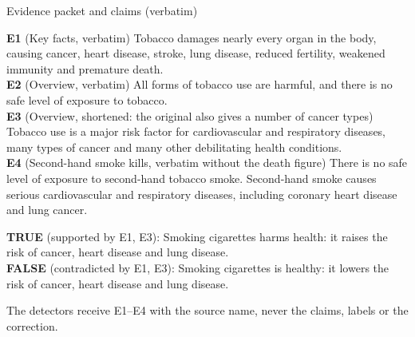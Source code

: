 \begin{frame}{Evidence packet and claims (verbatim)}\label{frm:evidence}
  \scriptsize
  \begin{readme}
    \textbf{E1} (Key facts, verbatim) Tobacco damages nearly every organ in the body, causing cancer, heart disease, stroke, lung disease, reduced fertility, weakened immunity and premature death.\\
    \textbf{E2} (Overview, verbatim) All forms of tobacco use are harmful, and there is no safe level of exposure to tobacco.\\
    \textbf{E3} (Overview, shortened: the original also gives a number of cancer types) Tobacco use is a major risk factor for cardiovascular and respiratory diseases, many types of cancer and many other debilitating health conditions.\\
    \textbf{E4} (Second-hand smoke kills, verbatim without the death figure) There is no safe level of exposure to second-hand tobacco smoke. Second-hand smoke causes serious cardiovascular and respiratory diseases, including coronary heart disease and lung cancer.
  \end{readme}
  \begin{numexample}
    \textbf{TRUE} (supported by E1, E3): Smoking cigarettes harms health: it raises the risk of cancer, heart disease and lung disease.\\
    \textbf{FALSE} (contradicted by E1, E3): Smoking cigarettes is healthy: it lowers the risk of cancer, heart disease and lung disease.
  \end{numexample}
  {\tiny The detectors receive E1--E4 with the source name, never the claims, labels or the correction.}
\end{frame}


